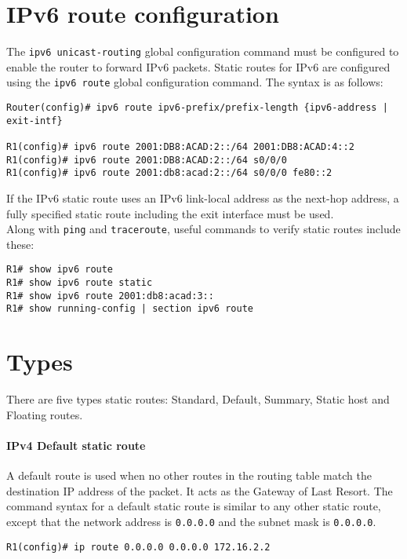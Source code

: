 \section{IPv6 route configuration}

The \verb|ipv6 unicast-routing| global configuration command must be configured to enable the router to forward IPv6 packets. Static routes for IPv6 are configured using the \verb|ipv6 route| global configuration command. The syntax is as follows:

\begin{verbatim}
Router(config)# ipv6 route ipv6-prefix/prefix-length {ipv6-address | exit-intf}

R1(config)# ipv6 route 2001:DB8:ACAD:2::/64 2001:DB8:ACAD:4::2
R1(config)# ipv6 route 2001:DB8:ACAD:2::/64 s0/0/0
R1(config)# ipv6 route 2001:db8:acad:2::/64 s0/0/0 fe80::2
\end{verbatim}

\note  If the IPv6 static route uses an IPv6 link-local address as the next-hop address, a fully specified static route including the exit interface must be used.\\

Along with \verb|ping| and \verb|traceroute|, useful commands to verify static routes include these:

\begin{verbatim}
R1# show ipv6 route
R1# show ipv6 route static
R1# show ipv6 route 2001:db8:acad:3::
R1# show running-config | section ipv6 route
\end{verbatim}

\section{Types}

There are five types static routes: Standard, Default, Summary, Static host and Floating routes.

\paragraph{IPv4 Default static route} A default route is used when no other routes in the routing table match the destination IP address of the packet. It acts as the Gateway of Last Resort. The command syntax for a default static route is similar to any other static route, except that the network address is \verb|0.0.0.0| and the subnet mask is \verb|0.0.0.0|.

\begin{verbatim}
R1(config)# ip route 0.0.0.0 0.0.0.0 172.16.2.2
\end{verbatim}


